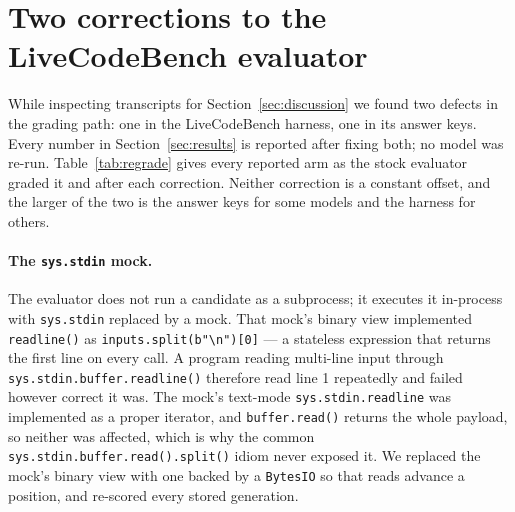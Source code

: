 \documentclass{article}
\begin{document}
\section{Two corrections to the LiveCodeBench evaluator}
\label{app:evaluator}

While inspecting transcripts for Section~\ref{sec:discussion} we found two defects in the grading
path: one in the LiveCodeBench harness, one in its answer keys. Every number in
Section~\ref{sec:results} is reported after fixing both; no model was re-run.
Table~\ref{tab:regrade} gives every reported arm as the stock evaluator graded it and after each
correction. Neither correction is a constant offset, and the larger of the two is the answer keys
for some models and the harness for others.

\paragraph{The \texttt{sys.stdin} mock.} The evaluator does not run a candidate as a subprocess;
it executes it in-process with
\texttt{sys.stdin} replaced by a mock. That mock's binary view implemented \texttt{readline()} as
\texttt{inputs.split(b"\textbackslash n")[0]} --- a stateless expression that returns the
first line on every call. A program reading multi-line input through
\texttt{sys.stdin.buffer.readline()} therefore read line 1 repeatedly and failed however correct it
was. The mock's text-mode \texttt{sys.stdin.readline} was implemented as a proper iterator, and
\texttt{buffer.read()} returns the whole payload, so neither was affected, which is why the
common \texttt{sys.stdin.buffer.read().split()} idiom never exposed it. We replaced the mock's
binary view with one backed by a \texttt{BytesIO} so that reads advance a position, and re-scored
every stored generation.
\end{document}
